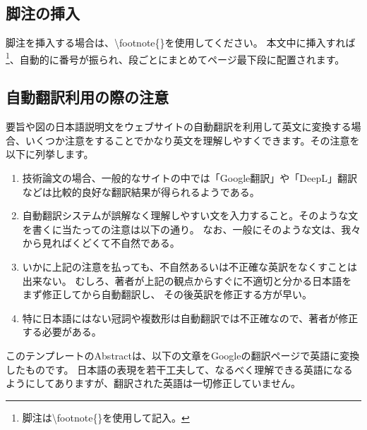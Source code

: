 \documentclass{PASJ2024}
\begin{document}
\subsection{脚注の挿入}
脚注を挿入する場合は、\textbackslash{footnote}\{\}を使用してください。
本文中に挿入すれば\footnote{脚注は\textbackslash{footnote}\{\}を使用して記入。}、自動的に番号が振られ、段ごとにまとめてページ最下段に配置されます。
%
\subsection{自動翻訳利用の際の注意}
\label{honyaku}
要旨や図の日本語説明文をウェブサイトの自動翻訳を利用して英文に変換する場合、いくつか注意をすることでかなり英文を理解しやすくできます。その注意を以下に列挙します。
%
\begin{enumerate}
%
\item{技術論文の場合、一般的なサイトの中では「Google翻訳」や「DeepL」翻訳などは比較的良好な翻訳結果が得られるようである。}
%
\item{自動翻訳システムが誤解なく理解しやすい文を入力すること。そのような文を書くに当たっての注意は以下の通り。
なお、一般にそのような文は、我々から見ればくどくて不自然である。}
%
\item{いかに上記の注意を払っても、不自然あるいは不正確な英訳をなくすことは出来ない。
むしろ、著者が上記の観点からすぐに不適切と分かる日本語をまず修正してから自動翻訳し、
その後英訳を修正する方が早い。}
%
\item{特に日本語にはない冠詞や複数形は自動翻訳では不正確なので、著者が修正する必要がある。}
%
\end{enumerate}

このテンプレートのAbstractは、以下の文章をGoogleの翻訳ページで英語に変換したものです。
日本語の表現を若干工夫して、なるべく理解できる英語になるようにしてありますが、翻訳された英語は一切修正していません。
\end{document}
